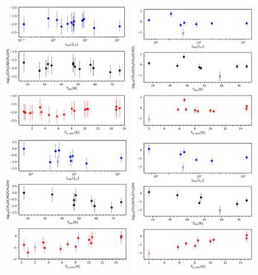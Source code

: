 \documentclass[twocolumn]{aastex62}
\begin{document}
\begin{figure}[htbp!]
  \centering
  \includegraphics[width=0.49\textwidth]{ratio_ch3cn_ch3oh.pdf}
  \includegraphics[width=0.49\textwidth]{ratio_ch3och3_ch3ocho.pdf}
  \includegraphics[width=0.49\textwidth]{ratio_ch3ocho_ch3oh.pdf}
  \includegraphics[width=0.49\textwidth]{ratio_ch3och3_ch3oh.pdf}

\end{figure}
\end{document}
